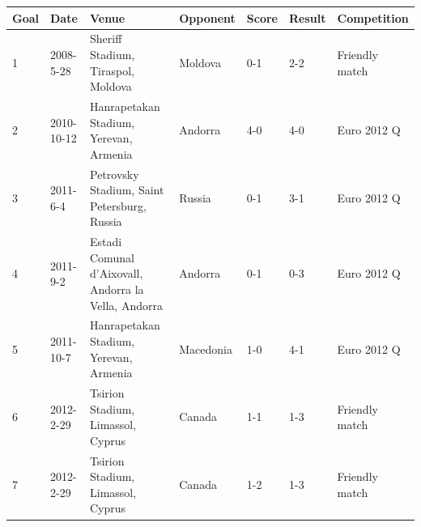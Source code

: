 \documentclass{article}
\begin{document}
\begin{tabular}{lllllll}
\toprule
Goal & Date & Venue & Opponent & Score & Result & Competition \\
\midrule
1 & 2008-5-28 & Sheriff Stadium, Tiraspol, Moldova & Moldova & 0-1 & 2-2 & Friendly match \\
2 & 2010-10-12 & Hanrapetakan Stadium, Yerevan, Armenia & Andorra & 4-0 & 4-0 & Euro 2012 Q \\
3 & 2011-6-4 & Petrovsky Stadium, Saint Petersburg, Russia & Russia & 0-1 & 3-1 & Euro 2012 Q \\
4 & 2011-9-2 & Estadi Comunal d'Aixovall, Andorra la Vella, Andorra & Andorra & 0-1 & 0-3 & Euro 2012 Q \\
5 & 2011-10-7 & Hanrapetakan Stadium, Yerevan, Armenia & Macedonia & 1-0 & 4-1 & Euro 2012 Q \\
6 & 2012-2-29 & Tsirion Stadium, Limassol, Cyprus & Canada & 1-1 & 1-3 & Friendly match \\
7 & 2012-2-29 & Tsirion Stadium, Limassol, Cyprus & Canada & 1-2 & 1-3 & Friendly match \\
\bottomrule
\end{tabular}
\end{document}
